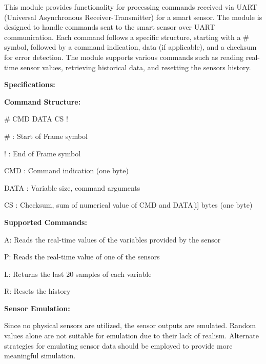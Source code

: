 This module provides functionality for processing commands received via UART (Universal Asynchronous Receiver-\/\+Transmitter) for a smart sensor. The module is designed to handle commands sent to the smart sensor over UART communication. Each command follows a specific structure, starting with a \textquotesingle{}\#\textquotesingle{} symbol, followed by a command indication, data (if applicable), and a checksum for error detection. The module supports various commands such as reading real-\/time sensor values, retrieving historical data, and resetting the sensor\textquotesingle{}s history.

{\bfseries{Specifications\+:}}
\begin{DoxyItemize}
\item {\bfseries{Command Structure\+:}}
\begin{DoxyItemize}
\item \textquotesingle{}\#\textquotesingle{} CMD DATA CS \textquotesingle{}!\textquotesingle{}
\item \# \+: Start of Frame symbol
\item ! \+: End of Frame symbol
\item CMD \+: Command indication (one byte)
\item DATA \+: Variable size, command arguments
\item CS \+: Checksum, sum of numerical value of CMD and DATA\mbox{[}i\mbox{]} bytes (one byte)
\end{DoxyItemize}
\item {\bfseries{Supported Commands\+:}}
\begin{DoxyItemize}
\item A\+: Reads the real-\/time values of the variables provided by the sensor
\item P\+: Reads the real-\/time value of one of the sensors
\item L\+: Returns the last 20 samples of each variable
\item R\+: Resets the history
\end{DoxyItemize}
\item {\bfseries{Sensor Emulation\+:}}
\begin{DoxyItemize}
\item Since no physical sensors are utilized, the sensor outputs are emulated. Random values alone are not suitable for emulation due to their lack of realism. Alternate strategies for emulating sensor data should be employed to provide more meaningful simulation.
\end{DoxyItemize}
\end{DoxyItemize}

